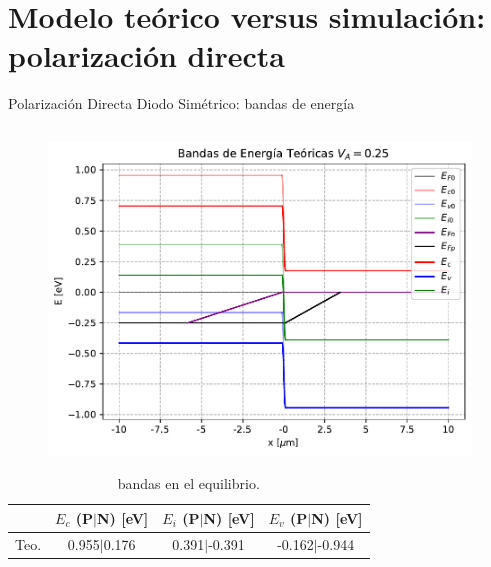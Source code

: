 \documentclass[aspectratio=169,xcolor=dvipsnames]{beamer}
\begin{document}
\section{Modelo teórico versus simulación: polarización directa}

\begin{frame}{Polarización Directa Diodo Simétrico: bandas de energía}
    \begin{columns} 
    \begin{column}{0.45\textwidth} 
        \vspace{-0.55cm}

        \begin{figure}
            \includegraphics[width=1\linewidth]{Teorico/Bandas_Energia-Directa.pdf}
        \end{figure}
        \vspace{-0.6cm}
        \begin{table}
            \caption{bandas en el equilibrio.}
            \begin{tabular}{c|ccc}
                & \tiny{$E_c$ (P$|$N)} \tiny{[eV]} & \tiny{$E_i$ (P$|$N)} \tiny{[eV]} & \tiny{$E_v$ (P$|$N)} \tiny{[eV]} \\ \hline

                \tiny{Teo.} & \tiny{0.955$|$0.176} & \tiny{0.391$|$-0.391} & \tiny{-0.162$|$-0.944} \\


\end{tabular}
\end{table}
\end{column}
\end{columns}
\end{frame}
\end{document}
